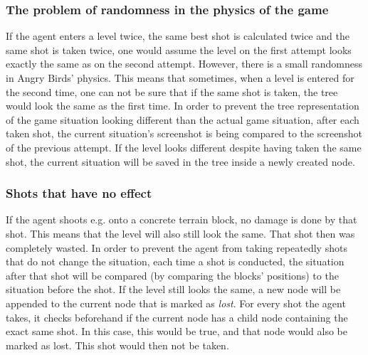 \subsubsection{The problem of randomness in the physics of the game}\label{subsec:randomnessInPhysics}
If the agent enters a level twice, the same best shot is calculated twice and the same shot is taken twice, one would assume the level on the first attempt looks exactly the same as on the second attempt. However, there is a small randomness in Angry Birds' physics. This means that sometimes, when a level is entered for the second time, one can not be sure that if the same shot is taken, the tree would look the same as the first time. In order to prevent the tree representation of the game situation looking different than the actual game situation, after each taken shot, the current situation's screenshot is being compared to the screenshot of the previous attempt. If the level looks different despite having taken the same shot, the current situation will be saved in the tree inside a newly created node.

\subsubsection{Shots that have no effect}\label{subsec:shotsThatHaveNoEffect}
If the agent shoots e.g. onto a concrete terrain block, no damage is done by that shot. This means that the level will also still look the same. That shot then was completely wasted. In order to prevent the agent from taking repeatedly shots that do not change the situation, each time a shot is conducted, the situation after that shot will be compared (by comparing the blocks' positions) to the situation before the shot. If the level still looks the same, a new node will be appended to the current node that is marked as \textit{lost}. For every shot the agent takes, it checks beforehand if the current node has a child node containing the exact same shot. In this case, this would be true, and that node would also be marked as lost. This shot would then not be taken.

